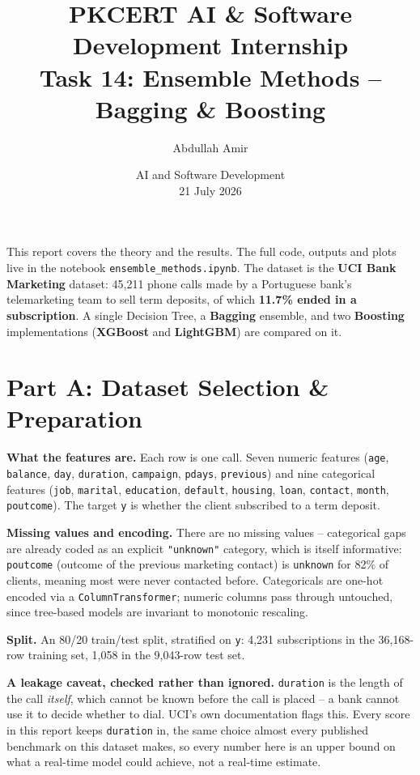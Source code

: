 \documentclass[11pt,a4paper]{article}
\title{\vspace{-1.5cm}\textbf{PKCERT AI \& Software Development Internship \\ Task 14: Ensemble Methods -- Bagging \& Boosting}}
\author{Abdullah Amir}
\date{AI and Software Development \\ 21 July 2026}
\begin{document}
\maketitle
\vspace{-0.8cm}

This report covers the theory and the results. The full code, outputs and plots live in
the notebook \texttt{ensemble\_methods.ipynb}. The dataset is the \textbf{UCI Bank
Marketing} dataset: 45,211 phone calls made by a Portuguese bank's telemarketing team to
sell term deposits, of which \textbf{11.7\% ended in a subscription}. A single Decision
Tree, a \textbf{Bagging} ensemble, and two \textbf{Boosting} implementations
(\textbf{XGBoost} and \textbf{LightGBM}) are compared on it.

\section*{Part A: Dataset Selection \& Preparation}

\textbf{What the features are.} Each row is one call. Seven numeric features
(\texttt{age}, \texttt{balance}, \texttt{day}, \texttt{duration}, \texttt{campaign},
\texttt{pdays}, \texttt{previous}) and nine categorical features (\texttt{job},
\texttt{marital}, \texttt{education}, \texttt{default}, \texttt{housing}, \texttt{loan},
\texttt{contact}, \texttt{month}, \texttt{poutcome}). The target \texttt{y} is whether the
client subscribed to a term deposit.

\textbf{Missing values and encoding.} There are no missing values -- categorical gaps are
already coded as an explicit \texttt{"unknown"} category, which is itself informative:
\texttt{poutcome} (outcome of the previous marketing contact) is \texttt{unknown} for 82\%
of clients, meaning most were never contacted before. Categoricals are one-hot encoded via
a \texttt{ColumnTransformer}; numeric columns pass through untouched, since tree-based
models are invariant to monotonic rescaling.

\textbf{Split.} An 80/20 train/test split, stratified on \texttt{y}: 4,231 subscriptions
in the 36,168-row training set, 1,058 in the 9,043-row test set.

\textbf{A leakage caveat, checked rather than ignored.} \texttt{duration} is the length of
the call \emph{itself}, which cannot be known before the call is placed -- a bank cannot
use it to decide whether to dial. UCI's own documentation flags this. Every score in this
report keeps \texttt{duration} in, the same choice almost every published benchmark on
this dataset makes, so every number here is an upper bound on what a real-time model could
achieve, not a real-time estimate.
\end{document}
